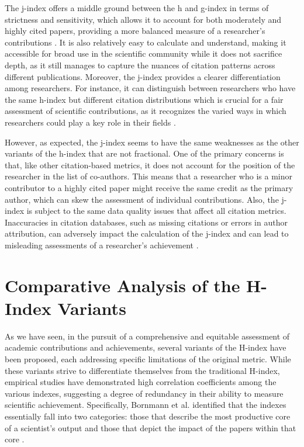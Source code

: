 The j-index offers a middle ground between the h and g-index in terms of
strictness and sensitivity, which allows it to account for both moderately and
highly cited papers, providing a more balanced measure of a researcher's contributions
\cite{mikhailov2014new}. It is also relatively easy to calculate and
understand, making it accessible for broad use in the scientific community
while it does not sacrifice depth, as it still manages to capture the nuances
of citation patterns across different publications. Moreover, the j-index
provides a clearer differentiation among researchers. For instance, it can
distinguish between researchers who have the same h-index but different
citation distributions which is crucial for a fair assessment of scientific
contributions, as it recognizes the varied ways in which researchers could play
a key role in their fields \cite{mikhailov2014new}.

However, as expected, the j-index seems to have the same weaknesses as the
other variants of the h-index that are not fractional. One of the primary
concerns is that, like other citation-based metrics, it does not account for
the position of the researcher in the list of co-authors. This means that a
researcher who is a minor contributor to a highly cited paper might receive the
same credit as the primary author, which can skew the assessment of individual
contributions. Also, the j-index is subject to the same data quality issues
that affect all citation metrics. Inaccuracies in citation databases, such as
missing citations or errors in author attribution, can adversely impact the
calculation of the j-index and can lead to misleading assessments of a
researcher’s achievement \cite{mikhailov2014new}.

\section{Comparative Analysis of the H-Index Variants}
As we have seen, in the pursuit of a comprehensive and equitable assessment of
academic contributions and achievements, several variants of the H-index have been proposed, each
addressing specific limitations of the original metric. While these variants
strive to differentiate themselves from the traditional H-index, empirical
studies have demonstrated high correlation coefficients among the various
indexes, suggesting a degree of redundancy in their ability to measure
scientific achievement. Specifically, Bornmann et al. identified that the
indexes essentially fall into two categories: those that describe the most
productive core of a scientist’s output and those that depict the impact of the
papers within that core \cite{bornmann2008are, bornmann2011multilevel}.

